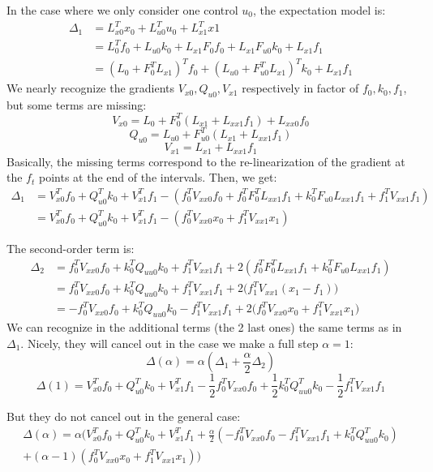 \documentclass[10pt,a4paper]{article}
\begin{document}
In the case where we only consider one control $u_0$, the expectation model is:
\begin{align*}
  \Delta_1 &= L_{x0}^T x_0 + L_{u0}^T u_0 + L_{x1}^T x1 \\
  &= L_{0}^T f_0 + L_{u0} k_0 + L_{x1} F_{0} f_0  + L_{x1} F_{u0} k_0  + L_{x1} f_1 \\
  &= (L_0 + F_0^T L_{x1})^T f_0 + (L_{u0} + F_{u0}^T L_{x1})^T k_0 + L_{x1} f_1
\end{align*}
We nearly recognize the gradients $V_{x0}, Q_{u0}, V_{x1}$ respectively in factor of $f_0,k_0,f_1$, but some terms are missing:
$$V_{x0} = L_0 + F_0^T (L_{x1} + L_{xx1} f_1) + L_{xx0} f_0$$
$$Q_{u0} = L_{u0} + F_{u0}^T (L_{x1} + L_{xx1} f_1)$$
$$V_{x1} = L_{x1} + L_{xx1} f_1$$
Basically, the missing terms correspond to the re-linearization of the gradient at the $f_t$ points at the end of the intervals.
Then, we get:
\begin{align*}
  \Delta_1 &= V_{x0}^T f_0 + Q_{u0}^T k_0 + V_{x1}^T f_1 - \left( f_0^T V_{xx0} f_0  + f_0^T F_0^T L_{xx1} f_1 + k_0^T F_{u0} L_{xx1} f_1 + f_1^T V_{xx1} f_1\right) \\
  &= V_{x0}^T f_0 + Q_{u0}^T k_0 + V_{x1}^T f_1 - \left( f_0^T V_{xx0} x_0 + f_1^T V_{xx1} x_1 \right)
\end{align*}

The second-order term is:
\begin{align*}
  \Delta_2 &= f_0^T V_{xx0} f_0 + k_0^T Q_{uu0} k_0 + f_1^T V_{xx1} f_1 + 2(f_0^T F_0^T L_{xx1} f_1 + k_0^T F_{u0} L_{xx1} f_1) \\
  &= f_0^T V_{xx0} f_0 + k_0^T Q_{uu0} k_0 + f_1^T V_{xx1} f_1 + 2\big(f_1^T V_{xx1} (x_1-f_1) \big) \\
  &= -f_0^T V_{xx0} f_0 + k_0^T Q_{uu0} k_0 - f_1^T V_{xx1} f_1 + 2\big(f_0^T V_{xx0} x_0 + f_1^T V_{xx1} x_1 \big)
\end{align*}
We can recognize in the additional terms (the 2 last ones) the same terms as in $\Delta_1$.
Nicely, they will cancel out in the case we make a full step $\alpha=1$:
$$\Delta(\alpha) = \alpha( \Delta_1+\frac{\alpha}{2} \Delta_2)$$
$$\Delta(1)= V_{x0}^T f_0 + Q_{u0}^T k_0 + V_{x1}^T f_1 
- \frac{1}{2} f_0^T V_{xx0} f_0 + \frac{1}{2} k_0^T Q_{uu0}^T k_0 - \frac{1}{2} f_1^T V_{xx1} f_1 $$

But they do not cancel out in the general case:
\begin{align*}
  \Delta(\alpha) = \alpha \Big( V_{x0}^T f_0 + Q_{u0}^T k_0 + V_{x1}^T f_1 
+ \frac{\alpha}{2} ( - f_0^T V_{xx0} f_0 - f_1^T V_{xx1} f_1 + k_0^T Q_{uu0}^T k_0 ) \\
+ (\alpha-1) ( f_0^T V_{xx0} x_0 + f_1^T V_{xx1} x_1 ) \Big)
\end{align*}
\end{document}
